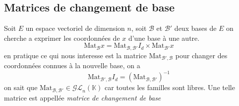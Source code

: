 \documentclass[11pt,colorlinks]{book}
\theoremstyle{mytheoremstyle}
\theoremstyle{mytheoremstyle}
\theoremstyle{mytheoremstyle}
\theoremstyle{mytheoremstyle}
\theoremstyle{mytheoremstyle}
\theoremstyle{mytheoremstyle}
\theoremstyle{mytheoremstyle}
\theoremstyle{mytheoremstyle}
\theoremstyle{myproblemstyle}
\def\mbb#1{\mathbb{#1}}
\def\mfc#1{\mathcal{#1}}
\def\bK{\mbb{K}}
\def\ev{espace vectoriel }
\begin{document}
\subsection{Matrices de changement de base}
\begin{definition}
  Soit $E$ un \ev de dimension $n$, soit $\mfc{B}$ et $\mfc{B}'$ deux bases de $E$ on cherche a exprimer les coordonnées de $x$ d'une base 
  à une autre. 
  \begin{equation*}
    \text{Mat}_{\mfc{B}} x = \text{Mat}_{\mfc{B},\mfc{B}'} I_d \times \text{Mat}_{\mfc{B}'} x
  \end{equation*}
  en pratique ce qui nous interesse est la matrice $\text{Mat}_{\mfc{B}',\mfc{B}}$ pour changer des coordonnées connues à la nouvelle base, on a 
  \begin{equation*}
    \text{Mat}_{\mfc{B}',\mfc{B}} I_d = \left(\text{Mat}_{\mfc{B},\mfc{B}'}\right)^{-1}
  \end{equation*}
  on sait que $\text{Mat}_{\mfc{B},\mfc{B}'} \in \mfc{GL}_n(\bK)$ car toutes les familles sont libres. 
  Une telle matrice est appellée \textit{matrice de changement de base}
\end{definition}
\end{document}

